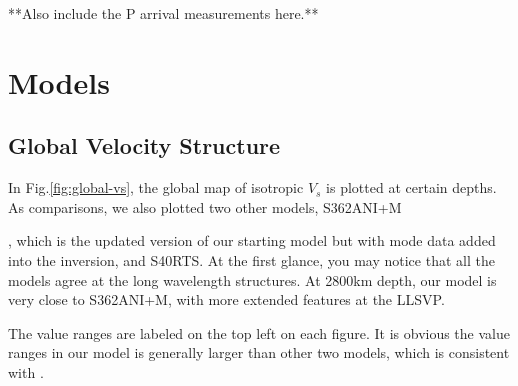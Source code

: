 \documentclass[extra,mreferee]{gji}
\begin{document}
**Also include the P arrival measurements here.**

\section{Models}

\subsection{Global Velocity Structure}
In Fig.\ref{fig:global-vs}, the global map of isotropic $V_s$ is plotted at certain depths.
As comparisons, we also plotted two other models, S362ANI+M{\citep{moulik2014anisotropic},
which is the updated version of our starting model but with mode data added
into the inversion, and S40RTS\citep{ritsema2011s40rts}. At the first glance,
you may notice that all the models agree at the long wavelength structures.
At 2800km depth, our model is very close to S362ANI+M, with more extended
features at the LLSVP.

The value ranges are labeled on the top left on each figure. It is obvious the
value ranges in our model is generally larger than other two models, which is
consistent with \cite{french2014whole}.

}
\end{document}
